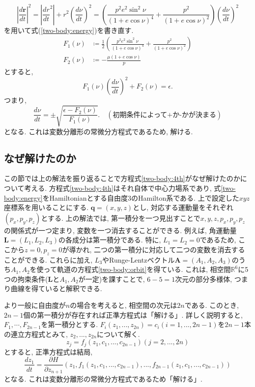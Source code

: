 \documentclass{ltjsarticle}
\theoremstyle{definition}
\numberwithin{thm}{section}
\theoremstyle{definition}
\numberwithin{prop}{section}
\theoremstyle{definition}
\numberwithin{dfn}{section}
\numberwithin{equation}{section}
\begin{document}
\begin{equation*}
    |\frac{d\bm{r}}{dt}|^2=|\frac{dr}{dt}^2|+r^2\left(\frac{d\nu}{dt}\right)^2=\left(\frac{p^2e^2\sin^2{\nu}}{(1+e\cos{\nu})^4}+\frac{p^2}{(1+e\cos{\nu})^2}\right)\left(\frac{d\nu}{dt}\right)^2
\end{equation*}
を用いて式(\ref{two-body:energy})を書き直す. 
\begin{equation}
    \begin{aligned}
        F_1(\nu)&\coloneq \frac{1}{2}(\frac{p^2e^2\sin^2{\nu}}{(1+e\cos{\nu})^4}+\frac{p^2}{(1+e\cos{\nu})^2})\\
        F_2(\nu)&\coloneq -\frac{\mu (1+e\cos{\nu})}{p}
    \end{aligned}
\end{equation}
とすると,
\begin{equation*}
    F_1(\nu)\left(\frac{d\nu}{dt}\right)^2+F_2(\nu)=\epsilon.
\end{equation*}
つまり,
\begin{equation}
    \frac{d\nu}{dt}=\pm \sqrt{\frac{\epsilon-F_2(\nu)}{F_1(\nu)}}.\quad (\text{初期条件によって+か-かが決まる})
\end{equation}
となる. これは変数分離形の常微分方程式であるため, 解ける.
\subsection{なぜ解けたのか}
この節では上の解法を振り返ることで方程式\ref{two-body:4th}がなぜ解けたのかについて考える. 方程式\ref{two-body:4th}はそれ自体で中心力場系であり, 式\ref{two-body:energy}をHamiltonianとする自由度3のHamilton系である. 上で設定した$xyz$座標系を用いることにする. $\bm{q}=(x,y,z)$とし, 対応する運動量をそれぞれ$(p_x,p_y,p_z)$とする. 上の解法では, 第一積分を一つ見出すことで$x,y,z,p_x,p_y,p_z$の関係式が一つ定まり, 変数を一つ消去することができる. 例えば, 角運動量$\bm{L}=(L_1,L_2,L_3)$の各成分は第一積分である. 特に, $L_1=L_2=0$であるため, ここから$z=0,p_z=0$が導かれ, 二つの第一積分に対応して二つの変数を消去することができる. これらに加え, $L_3$やRunge-Lentzベクトル$\bm{A}=(A_1,A_2,A_3)$のうち$A_1,A_2$を使って軌道の方程式\ref{two-body:orbit}を得ている. これは, 相空間$\mathbb{R}^6$に5つの拘束条件($\bm{L}$と$A_1,A_2$が一定)を課すことで, $6-5=1$次元の部分多様体, つまり曲線を得ていると解釈できる.

より一般に自由度が$n$の場合を考えると, 相空間の次元は$2n$である. このとき,$2n-1$個の第一積分が存在すれば正準方程式は「解ける」. 詳しく説明すると, $F_1,\cdots,F_{2n-1}$を第一積分とする. $F_i(z_1,...,z_{2n})=c_i(i=1,...,2n-1)$を$2n-1$本の連立方程式とみて, $z_2,...,z_{2n}$について解く.
\begin{equation*}
    z_j=f_j(z_1,c_1,...,c_{2n-1})(j=2,...,2n)
\end{equation*}
とすると, 正準方程式は結局,
\begin{equation}
    \frac{dz_1}{dt}=\frac{\partial H}{\partial z_{n+1}}(z_1,f_1(z_1,c_1,...,c_{2n-1}),...,f_{2n-1}(z_1,c_1,...,c_{2n-1}))
\end{equation}
となる. これは変数分離形の常微分方程式であるため「解ける」.
 
\end{document}
